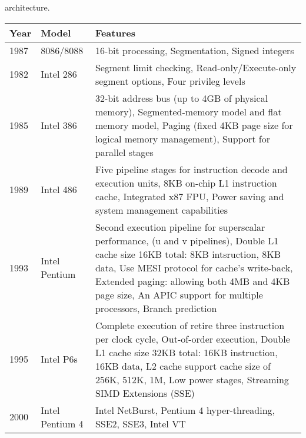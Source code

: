 \documentclass[letterpaper,10pt,titlepage]{article}
\begin{document}
architecture. 
\begin{center}
   \begin{longtable}{l l p{10cm}}
      \textbf{Year} & \textbf{Model}      & \textbf{Features}\\ \hline

      1987 & 8086/8088  & 16-bit processing, Segmentation, Signed integers \\ 
      \hline
      1982 & Intel 286  & Segment limit checking, Read-only/Execute-only 
      			  segment options, Four privileg levels \\
      \hline
      1985 & Intel 386  & 32-bit address bus (up to 4GB of physical memory),
      			  \newline
      			  Segmented-memory model and flat memory model,
			  \newline
			  Paging (fixed 4KB page size for logical
			  memory management), 
			  \newline
			  Support for parallel stages \\
      \hline
      1989 & Intel 486  & Five pipeline stages for instruction decode and
      			  execution units, 
			  \newline
			  8KB on-chip L1 instruction cache, 
			  \newline
			  Integrated x87 FPU,
		          \newline
			  Power saving and system management capabilities\\
      \hline
      1993 & Intel Pentium & Second execution pipeline for superscalar performance,
      			  \newline
      			  (u and v pipelines),
			  \newline
			  Double L1 cache size 16KB total: 8KB intsruction, 
			  8KB data,
			  \newline
			  Use MESI protocol for cache's write-back,
			  \newline
			  Extended paging: allowing both 4MB and 4KB page size,
			  \newline
			  An APIC support for multiple processors,
			  \newline
			  Branch prediction\\
     \hline
     1995\newline-1999 & Intel P6s & Complete execution of retire three instruction 
     			  per clock cycle, 
			  \newline
			  Out-of-order execution,
			  \newline
			  Double L1 cache size 32KB total: 16KB instruction, 
			  16KB data,
			  \newline
			  L2 cache support cache size of 256K, 512K, 1M,
			  \newline
			  Low power stages,
			  Streaming SIMD Extensions (SSE)\\
     \hline
     2000\newline-2006 & Intel Pentium 4 & Intel NetBurst,
			  Pentium 4 hyper-threading,
			  SSE2, SSE3, Intel VT \\
     \hline
   \end{longtable}
\end{center}
\end{document}
